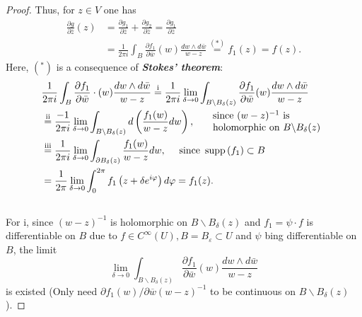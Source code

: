 \begin{proof}
Thus, for $z \in V$ one has
$$
\begin{aligned}
\frac{\partial g}{\partial \bar{z}}(z) & =\frac{\partial g_1}{\partial \bar{z}}+\frac{\partial g_2}{\partial \bar{z}}=\frac{\partial g_1}{\partial \bar{z}} \\
& =\frac{1}{2 \pi i} \int_B \frac{\partial f_1}{\partial \bar{w}}(w) \frac{d w \wedge d \bar{w}}{w-z} \stackrel{(*)}{=} f_1(z)=f(z) .
\end{aligned}
$$
Here, $\left(^*\right)$ is a consequence of \textit{\textbf{Stokes' theorem}}:
$$
\begin{aligned}
& \frac{1}{2 \pi i} \int_B \frac{\partial f_1}{\partial \bar{w}} \cdot(w) \frac{d w \wedge d \bar{w}}{w-z}\stackrel{\textmd{i}}{=}\frac{1}{2 \pi i} \lim _{\delta \rightarrow 0} \int_{B \backslash B_\delta(z)} \frac{\partial f_1}{\partial \bar{w}}(w) \frac{d w \wedge d \bar{w}}{w-z} \\
& \stackrel{\textmd{ii}}{=}\frac{-1}{2 \pi i} \lim _{\delta \rightarrow 0} \int_{B \backslash B_\delta(z)} d\left(\frac{f_1(w)}{w-z} d w\right), \quad \begin{array}{l}
\text { since }(w-z)^{-1} \text { is } \\
\text { holomorphic on } B \backslash B_\delta(z)
\end{array} \\
& \stackrel{\textmd{iii}}{=}\frac{1}{2 \pi i} \lim _{\delta \rightarrow 0} \int_{\partial B_\delta(z)} \frac{f_1(w)}{w-z} d w, \quad \text { since } \operatorname{supp}\left(f_1\right) \subset B \\
& =\frac{1}{2 \pi} \lim _{\delta \rightarrow 0} \int_0^{2 \pi} f_1\left(z+\delta e^{i \varphi}\right) d \varphi=f_1(z) . \\
&
\end{aligned}
$$
For i, since $(w-z)^{-1}$ is holomorphic on $B\backslash B_\delta(z)$ and $f_1=\psi\cdot f$  is differentiable on $B$ due to $f\in C^\infty (U), B=B_\varepsilon\subset U$ and $\psi$ bing differentiable on $B$, the limit 
\[\lim _{\delta \rightarrow 0} \int_{B \backslash B_\delta(z)} \frac{\partial f_1}{\partial \bar{w}}(w) \frac{d w \wedge d \bar{w}}{w-z}\]
 is existed (Only need $\partial f_1(w)/\partial \overline{w} (w-z)^{-1}$ to be continuous on $B \backslash B_\delta(z)$).


\end{proof}
